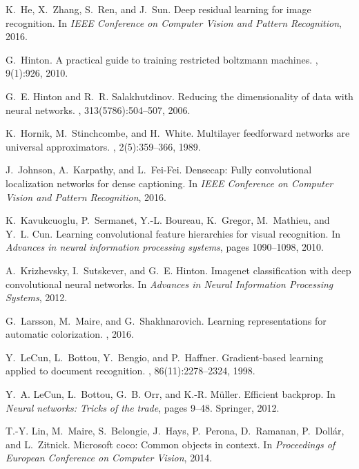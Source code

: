 \documentclass[10pt,twocolumn,letterpaper]{article}
\begin{document}
\begin{thebibliography}{10}
K.~He, X.~Zhang, S.~Ren, and J.~Sun.
\newblock Deep residual learning for image recognition.
\newblock In {\em IEEE Conference on Computer Vision and Pattern Recognition},
  2016.

G.~Hinton.
\newblock A practical guide to training restricted boltzmann machines.
, 9(1):926, 2010.

G.~E. Hinton and R.~R. Salakhutdinov.
\newblock Reducing the dimensionality of data with neural networks.
, 313(5786):504--507, 2006.

K.~Hornik, M.~Stinchcombe, and H.~White.
\newblock Multilayer feedforward networks are universal approximators.
, 2(5):359--366, 1989.

J.~Johnson, A.~Karpathy, and L.~Fei-Fei.
\newblock Densecap: Fully convolutional localization networks for dense
  captioning.
\newblock In {\em IEEE Conference on Computer Vision and Pattern Recognition},
  2016.

K.~Kavukcuoglu, P.~Sermanet, Y.-L. Boureau, K.~Gregor, M.~Mathieu, and Y.~L.
  Cun.
\newblock Learning convolutional feature hierarchies for visual recognition.
\newblock In {\em Advances in neural information processing systems}, pages
  1090--1098, 2010.

A.~Krizhevsky, I.~Sutskever, and G.~E. Hinton.
\newblock Imagenet classification with deep convolutional neural networks.
\newblock In {\em Advances in Neural Information Processing Systems}, 2012.

G.~Larsson, M.~Maire, and G.~Shakhnarovich.
\newblock Learning representations for automatic colorization.
, 2016.

Y.~LeCun, L.~Bottou, Y.~Bengio, and P.~Haffner.
\newblock Gradient-based learning applied to document recognition.
, 86(11):2278--2324, 1998.

Y.~A. LeCun, L.~Bottou, G.~B. Orr, and K.-R. M{\"u}ller.
\newblock Efficient backprop.
\newblock In {\em Neural networks: Tricks of the trade}, pages 9--48. Springer,
  2012.

T.-Y. Lin, M.~Maire, S.~Belongie, J.~Hays, P.~Perona, D.~Ramanan,
  P.~Doll\'{a}r, and L.~Zitnick.
\newblock Microsoft coco: Common objects in context.
\newblock In {\em Proceedings of European Conference on Computer Vision}, 2014.


\end{thebibliography}
\end{document}
